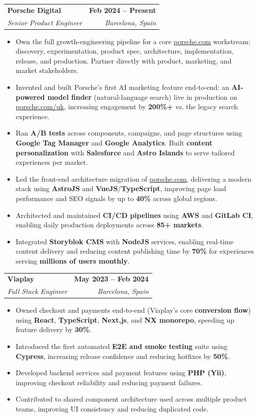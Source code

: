 \documentclass[letterpaper,11pt]{article}
\makeatletter
\newcommand{\resumeItem}[1]{
  \item\small{{#1 \vspace{-2pt}}}
}
\newcommand{\resumeSubheading}[4]{
  \vspace{-2pt}\item
    \begin{tabular*}{1.0\textwidth}[t]{l@{\extracolsep{\fill}}r}
      \textbf{#1} & \textbf{\small #2} \\
      \textit{\small#3} & \textit{\small #4} \\
    \end{tabular*}\vspace{-7pt}
}
\newcommand{\resumeItemListStart}{\begin{itemize}}
\newcommand{\resumeItemListEnd}{\end{itemize}\vspace{-5pt}}
\makeatother
\begin{document}
    \resumeSubheading
      {Porsche Digital}{Feb 2024 -- Present}
      {Senior Product Engineer}{Barcelona, Spain}
      \resumeItemListStart
        \resumeItem{Own the full growth-engineering pipeline for a core \href{https://porsche.com}{\underline{porsche.com}} workstream: discovery, experimentation, product spec, architecture, implementation, release, and production. Partner directly with product, marketing, and market stakeholders.}
        \resumeItem{Invented and built Porsche's first AI marketing feature end-to-end: an \textbf{AI-powered model finder} (natural-language search) live in production on \href{https://www.porsche.com/uk}{\underline{porsche.com/uk}}, increasing engagement by \textbf{200\%+} vs. the legacy search experience.}
        \resumeItem{Ran \textbf{A/B tests} across components, campaigns, and page structures using \textbf{Google Tag Manager} and \textbf{Google Analytics}. Built \textbf{content personalization} with \textbf{Salesforce} and \textbf{Astro Islands} to serve tailored experiences per market.}
        \resumeItem{Led the front-end architecture migration of \href{https://porsche.com}{\underline{porsche.com}}, delivering a modern stack using \textbf{AstroJS} and \textbf{VueJS}/\textbf{TypeScript}, improving page load performance and SEO signals by up to \textbf{40\%} across global regions.}
        \resumeItem{Architected and maintained \textbf{CI/CD pipelines} using \textbf{AWS} and \textbf{GitLab CI}, enabling daily production deployments across \textbf{85+ markets}.}
        \resumeItem{Integrated \textbf{Storyblok CMS} with \textbf{NodeJS} services, enabling real-time content delivery and reducing content publishing time by \textbf{70\%} for experiences serving \textbf{millions of users monthly}.}
      \resumeItemListEnd
    \vspace{6pt}


    \resumeSubheading
      {Viaplay}{May 2023 -- Feb 2024}
      {Full Stack Engineer}{Barcelona, Spain}
      \resumeItemListStart
        \resumeItem{Owned checkout and payments end-to-end (Viaplay's core \textbf{conversion flow}) using \textbf{React}, \textbf{TypeScript}, \textbf{Next.js}, and \textbf{NX monorepo}, speeding up feature delivery by \textbf{30\%}.}
        \resumeItem{Introduced the first automated \textbf{E2E and smoke testing} suite using \textbf{Cypress}, increasing release confidence and reducing hotfixes by \textbf{50\%}.}
        \resumeItem{Developed backend services and payment features using \textbf{PHP (Yii)}, improving checkout reliability and reducing payment failures.}
        \resumeItem{Contributed to shared component architecture used across multiple product teams, improving UI consistency and reducing duplicated code.}
      \resumeItemListEnd
    \vspace{6pt}
\end{document}
